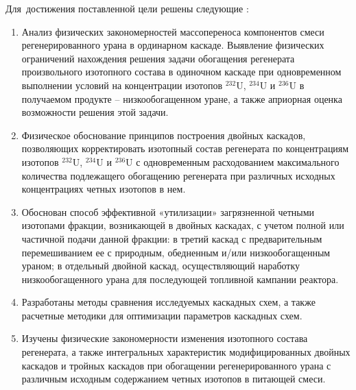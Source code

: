 Для~достижения поставленной цели решены следующие {\tasks}:
\begin{enumerate}
  \item Анализ физических закономерностей массопереноса компонентов смеси
  регенерированного урана в ординарном каскаде.
  Выявление физических ограничений нахождения решения задачи обогащения регенерата произвольного изотопного
  состава в одиночном каскаде при одновременном выполнении условий на
  концентрации изотопов $^{232}$U, $^{234}$U и $^{236}$U в получаемом продукте – низкообогащенном уране, а также априорная оценка возможности решения этой задачи.
  \item Физическое обоснование принципов построения двойных каскадов,
  позволяющих корректировать изотопный состав регенерата по концентрациям
  изотопов $^{232}$U, $^{234}$U и $^{236}$U с одновременным расходованием максимального количества
  подлежащего обогащению регенерата при различных исходных концентрациях
  четных изотопов в нем.
  \item Обоснован способ эффективной «утилизации» загрязненной четными
  изотопами фракции, возникающей в двойных каскадах, с учетом полной или
  частичной подачи данной фракции: в третий каскад с предварительным
  перемешиванием ее с природным, обедненным и/или низкообогащенным ураном; в отдельный двойной каскад, осуществляющий наработку низкообогащенного урана для последующей топливной кампании реактора.
  \item Разработаны методы сравнения исследуемых каскадных схем, а также расчетные методики для оптимизации параметров каскадных схем.
  \item Изучены физические закономерности изменения изотопного состава регенерата, а также
  интегральных характеристик модифицированных двойных каскадов и тройных
  каскадов при обогащении регенерированного урана с различным исходным
  содержанием четных изотопов в питающей смеси.
\end{enumerate}


